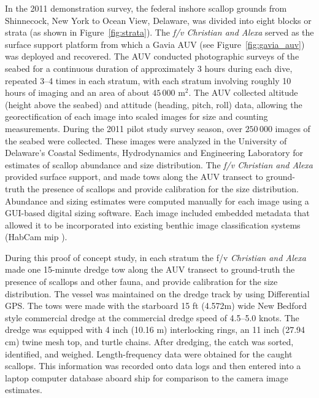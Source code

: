 In the 2011 demonstration survey, the federal inshore scallop grounds from Shinnecock, New York to Ocean View, Delaware, was divided into eight blocks or strata (as shown in Figure~\ref{fig:strata}).  
The \textit{f/v Christian and Alexa} served as the surface support platform 
from which a Gavia AUV (see Figure~\ref{fig:gavia_auv}) was deployed and recovered.  The AUV 
conducted photographic surveys of the seabed for a continuous duration of approximately
3 hours during each dive, repeated 3--4 times in each stratum, with
each stratum involving roughly 10 hours of imaging and an area of about $45\,000$ 
m$^2$.
The AUV collected altitude (height above the seabed) and 
attitude (heading, pitch, roll) data, allowing the georectification of each image 
into scaled images for size and counting measurements.  During the 2011 pilot study 
survey season, over $250\,000$ images of the seabed were collected. 
These images were analyzed in the University of Delaware's Coastal Sediments, Hydrodynamics and Engineering 
Laboratory for estimates of scallop
abundance and size distribution.  The \textit{f/v Christian and Alexa} provided 
surface support, and made tows along the AUV transect to ground-truth the presence of 
scallops and provide calibration for the size distribution. 
Abundance and sizing estimates were computed manually for each image using a GUI-based 
digital sizing software. 
Each image included embedded metadata that 
allowed it to be incorporated into existing benthic image classification systems
(HabCam mip \cite{dawkings13}).

During this proof of concept study, in each stratum the f/v
\textit{Christian and Alexa} made one 15-minute dredge tow along the AUV 
transect to ground-truth the presence of scallops and other fauna, 
and provide calibration for the size distribution.  The vessel was maintained 
on the dredge track by using Differential GPS.  
The tows were made with the starboard 15 ft 
(4.572\;m)
wide New Bedford style commercial dredge at the commercial dredge speed of 4.5--5.0 knots.
The dredge was equipped with 4 inch (10.16 m) interlocking rings, 
an 11 inch (27.94 cm) twine mesh top, and turtle chains.
After dredging, the catch was sorted, identified, and weighed.  
Length-frequency data were obtained for the caught scallops.  
This information was recorded onto data logs and then entered into a laptop computer database aboard ship for comparison to the camera image estimates.

